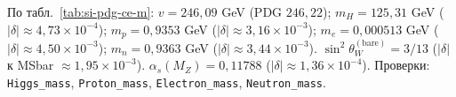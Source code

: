 По табл.~\ref{tab:si-pdg-ce-m}: $v=246{,}09$ GeV (PDG $246{,}22$);
$m_H=125{,}31$ GeV ($|\delta|\approx 4{,}73\times 10^{-4}$);
$m_p=0{,}9353$ GeV ($|\delta|\approx 3{,}16\times 10^{-3}$);
$m_e=0{,}000513$ GeV ($|\delta|\approx 4{,}50\times 10^{-3}$);
$m_n=0{,}9363$ GeV ($|\delta|\approx 3{,}44\times 10^{-3}$).
$\sin^2\theta_W^{(\mathrm{bare})}=3/13$ ($|\delta|$ к MSbar $\approx 1{,}95\times 10^{-3}$).
$\alpha_s(M_Z)=0{,}11788$ ($|\delta|\approx 1{,}36\times 10^{-4}$).
Проверки: \texttt{Higgs\_mass}, \texttt{Proton\_mass}, \texttt{Electron\_mass}, \texttt{Neutron\_mass}.

